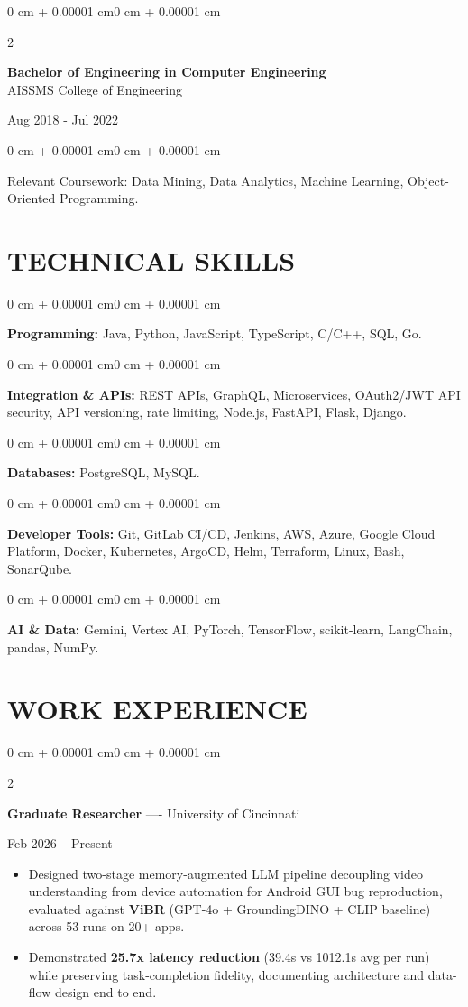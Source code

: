 \documentclass[10pt, letterpaper]{article}
\newenvironment{highlights}{
    \begin{itemize}[
        topsep=0.10 cm,
        parsep=0.06 cm,
        partopsep=0pt,
        itemsep=0.06 cm,
        leftmargin=12pt
    ]
}{
    \end{itemize}
}
\newenvironment{onecolentry}{
    \begin{adjustwidth}{0 cm + 0.00001 cm}{0 cm + 0.00001 cm}
}{
    \end{adjustwidth}
}
\newenvironment{twocolentry}[2][]{
    \onecolentry
    \def\secondColumn{#2}
    \setcolumnwidth{\fill, 4.5 cm}
    \begin{paracol}{2}
}{
    \switchcolumn \raggedleft \secondColumn
    \end{paracol}
    \endonecolentry
}
\begin{document}
\begin{twocolentry}{
    Aug 2018 - Jul 2022
}
    \textbf{Bachelor of Engineering in Computer Engineering} \\
    AISSMS College of Engineering
\end{twocolentry}
\begin{onecolentry}
Relevant Coursework: Data Mining, Data Analytics, Machine Learning, Object-Oriented Programming.
\end{onecolentry}
\section{TECHNICAL SKILLS}
\begin{onecolentry}
\textbf{Programming:} Java, Python, JavaScript, TypeScript, C/C++, SQL, Go.
\end{onecolentry}
\vspace{0.06 cm}
\begin{onecolentry}
\textbf{Integration \& APIs:} REST APIs, GraphQL, Microservices, OAuth2/JWT API security, API versioning, rate limiting, Node.js, FastAPI, Flask, Django.
\end{onecolentry}
\vspace{0.06 cm}
\begin{onecolentry}
\textbf{Databases:} PostgreSQL, MySQL.
\end{onecolentry}
\vspace{0.06 cm}
\begin{onecolentry}
\textbf{Developer Tools:} Git, GitLab CI/CD, Jenkins, AWS, Azure, Google Cloud Platform, Docker, Kubernetes, ArgoCD, Helm, Terraform, Linux, Bash, SonarQube.
\end{onecolentry}
\vspace{0.06 cm}
\begin{onecolentry}
\textbf{AI \& Data:} Gemini, Vertex AI, PyTorch, TensorFlow, scikit-learn, LangChain, pandas, NumPy.
\end{onecolentry}

\section{WORK EXPERIENCE}
\begin{twocolentry}{Feb 2026 -- Present}
\textbf{Graduate Researcher} ---- University of Cincinnati
\end{twocolentry}
\begin{highlights}
  \item Designed two-stage memory-augmented LLM pipeline decoupling video understanding from device automation for Android GUI bug reproduction, evaluated against \textbf{ViBR} (GPT-4o + GroundingDINO + CLIP baseline) across 53 runs on 20+ apps.
  \item Demonstrated \textbf{25.7x latency reduction} (39.4s vs 1012.1s avg per run) while preserving task-completion fidelity, documenting architecture and data-flow design end to end.
\end{highlights}
\end{document}
